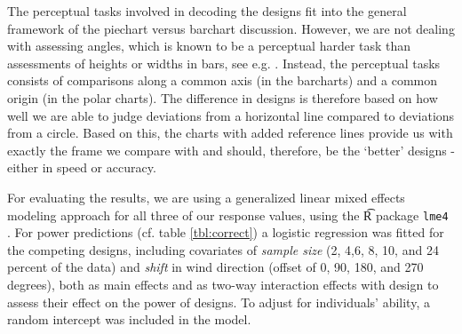 The perceptual tasks involved in decoding the designs fit into the general framework of the piechart versus barchart discussion. However, we are not dealing with assessing angles, which is known to be a perceptual harder task than assessments of heights or widths in bars, see e.g. \cite{cleveland:1984, robbins:2004, few:2009}. Instead, the perceptual tasks consists of comparisons along a common axis (in the barcharts) and a common origin (in the polar charts). The difference in designs is therefore based on how well we are able to judge deviations from a horizontal line compared to deviations from a circle. Based on this, the charts with added reference lines provide us with exactly the frame we compare with and should, therefore, be the `better' designs - either in speed or accuracy.



For evaluating the results, we are using a generalized linear mixed effects modeling  approach \cite{pinheiro:2000} for all three of our response values, using the {\t R} package {\tt lme4} \cite{bates:2011}. 
For power predictions (cf. table \ref{tbl:correct}) a logistic regression was fitted for the competing designs, including covariates of {\it sample size} (2, 4,6, 8, 10, and 24 percent of the data) and {\it shift} in wind direction (offset of 0, 90, 180, and 270 degrees), both as main effects and as two-way interaction effects with design to assess their effect on the power of designs. To adjust for individuals' ability, a random intercept was included in the model.

